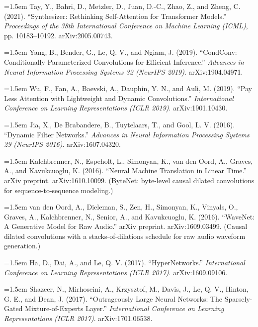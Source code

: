 \documentclass[11pt]{article}
\begin{document}
\par\hangindent=1.5em
Tay, Y., Bahri, D., Metzler, D., Juan, D.-C., Zhao, Z., and Zheng, C. (2021). ``Synthesizer: Rethinking Self-Attention for Transformer Models.'' \textit{Proceedings of the 38th International Conference on Machine Learning (ICML)}, pp. 10183--10192. arXiv:2005.00743.

\par\hangindent=1.5em
Yang, B., Bender, G., Le, Q. V., and Ngiam, J. (2019). ``CondConv: Conditionally Parameterized Convolutions for Efficient Inference.'' \textit{Advances in Neural Information Processing Systems 32 (NeurIPS 2019)}. arXiv:1904.04971.

\par\hangindent=1.5em
Wu, F., Fan, A., Baevski, A., Dauphin, Y. N., and Auli, M. (2019). ``Pay Less Attention with Lightweight and Dynamic Convolutions.'' \textit{International Conference on Learning Representations (ICLR 2019)}. arXiv:1901.10430.

\par\hangindent=1.5em
Jia, X., De Brabandere, B., Tuytelaars, T., and Gool, L. V. (2016). ``Dynamic Filter Networks.'' \textit{Advances in Neural Information Processing Systems 29 (NeurIPS 2016)}. arXiv:1607.04320.

\par\hangindent=1.5em
Kalchbrenner, N., Espeholt, L., Simonyan, K., van den Oord, A., Graves, A., and Kavukcuoglu, K. (2016). ``Neural Machine Translation in Linear Time.'' arXiv preprint. arXiv:1610.10099. (ByteNet: byte-level causal dilated convolutions for sequence-to-sequence modeling.)

\par\hangindent=1.5em
van den Oord, A., Dieleman, S., Zen, H., Simonyan, K., Vinyals, O., Graves, A., Kalchbrenner, N., Senior, A., and Kavukcuoglu, K. (2016). ``WaveNet: A Generative Model for Raw Audio.'' arXiv preprint. arXiv:1609.03499. (Causal dilated convolutions with a stacks-of-dilations schedule for raw audio waveform generation.)

\par\hangindent=1.5em
Ha, D., Dai, A., and Le, Q. V. (2017). ``HyperNetworks.'' \textit{International Conference on Learning Representations (ICLR 2017)}. arXiv:1609.09106.

\par\hangindent=1.5em
Shazeer, N., Mirhoseini, A., Krzysztof, M., Davis, J., Le, Q. V., Hinton, G. E., and Dean, J. (2017). ``Outrageously Large Neural Networks: The Sparsely-Gated Mixture-of-Experts Layer.'' \textit{International Conference on Learning Representations (ICLR 2017)}. arXiv:1701.06538.
\end{document}
